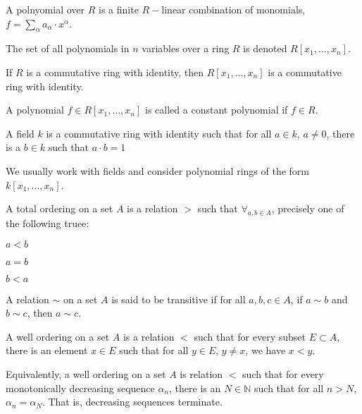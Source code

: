 \documentclass[crop=false,class=book]{standalone}
\begin{document}
\begin{definition}
A polnyomial over $R$ is a finite $R-$linear combination of monomials, $f=\sum_{\alpha} a_{\alpha} \cdot x^{\alpha}$.
\end{definition}
\begin{notation}
The set of all polynomials in $n$ variables over a ring $R$ is denoted $R[x_1,\hdots, x_n]$.
\end{notation}
\begin{theorem}
If $R$ is a commutative ring with identity, then $R[x_1,\hdots, x_n]$ is a commutative ring with identity.
\end{theorem}
\begin{definition}
A polynomial $f\in R[x_1,\hdots, x_n]$ is called a constant polynomial if $f\in R$.
\end{definition}
\begin{definition}
A field $k$ is a commutative ring with identity such that for all $a\in k$, $a\ne 0$, there is a $b\in k$ such that $a\cdot b=1$
\end{definition}
\begin{remark}
We usually work with fields and consider polynomial rings of the form $k[x_1,\hdots ,x_n]$.
\end{remark}
\begin{definition}
A total ordering on a set $A$ is a relation $>$ such that $\forall_{a,b\in A}$, precisely one of the following truee:
\begin{enumerate}
    \begin{multicols}{3}
    \item $a<b$
    \item $a=b$
    \item $b<a$
    \end{multicols}
\end{enumerate}
\end{definition}
\begin{definition}
A relation $\sim$ on a set $A$ is said to be transitive if for all $a,b,c\in A$, if $a\sim b$ and $b\sim c$, then $a\sim c$.
\end{definition}
\begin{definition}
A well ordering on a set $A$ is a relation $<$ such that for every subset $E\subset A$, there is an element $x\in E$ such that for all $y\in E$, $y\ne x$, we have $x<y$.
\end{definition}
\begin{remark}
Equivalently, a well ordering on a set $A$ is relation $<$ such that for every monotonically decreasing sequence $\alpha_n$, there is an $N\in \mathbb{N}$ such that for all $n>N$, $\alpha_n = \alpha_N$. That is, decreasing sequences terminate.
\end{remark}
\end{document}
